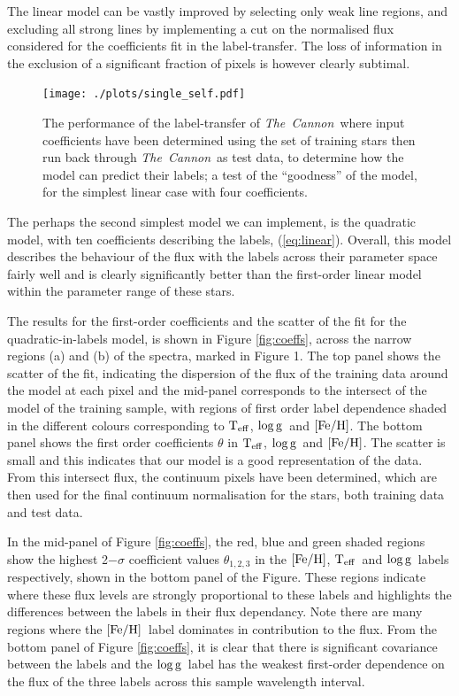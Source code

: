 \documentclass[12pt, preprint]{aastex}
\newcommand{\teff}{\mbox{$\rm T_{eff}$}}
\newcommand{\feh}{\mbox{$\rm [Fe/H]$}}
\newcommand{\logg}{\mbox{$\rm \log g$}}
\newcommand{\tc}{\textsl{The~Cannon}}
\begin{document}
The linear model can be vastly improved by selecting only weak line regions, and excluding all strong lines by implementing a cut on the normalised flux considered for the coefficients fit in the label-transfer. The loss of information in the exclusion of a significant fraction of pixels is however clearly subtimal. 

\begin{figure}[h!]
\centering
  \texttt{[image: ./plots/single\_self.pdf]}
\caption{The performance of the label-transfer of \tc\, where input coefficients have been determined using the set of training stars then run back through \tc\ as test data, to determine how the model can predict their labels; a test of the ``goodness'' of the model, for the simplest linear case with four coefficients. }
\label{fig:self1}
\end{figure}

The perhaps the second simplest model we can implement, is the quadratic model, with ten coefficients describing the labels, (\ref{eq:linear}).  Overall, this model describes the behaviour of the flux with the labels across their parameter space fairly well and is clearly significantly better than the first-order linear model within the parameter range of these stars. 

The results for the first-order coefficients and the scatter of the fit for the quadratic-in-labels model, is shown in Figure \ref{fig:coeffs}, across the narrow regions (a) and (b) of the spectra, marked in Figure 1. The top panel shows the scatter of the fit, indicating the dispersion of the flux of the training data around the model at each pixel and the mid-panel corresponds to the intersect of the model of the training sample, with regions of first order label dependence shaded in the different colours corresponding to \teff, \logg\ and \feh. The bottom panel shows the first order coefficients $\theta$ in \teff, \logg\ and \feh.  The scatter is small and this indicates that our model is a good representation of the data. From this intersect flux, the continuum pixels have been determined, which  are then used for the final continuum normalisation for the stars, both training data and test data. 

 In the mid-panel of Figure \ref{fig:coeffs}, the red, blue and green shaded regions show the highest 2$-\sigma$ coefficient values $\theta_{1,2,3}$ in the \feh, \teff\ and \logg\ labels respectively, shown in the bottom panel of the Figure. These regions indicate where these flux levels are strongly proportional to these labels and highlights the differences between the labels in their flux dependancy. Note there are many regions where the \feh\ label dominates in contribution to the flux. From the bottom panel of Figure \ref{fig:coeffs}, it is clear that there is significant covariance between the labels and the \logg\ label has the weakest first-order dependence on the flux of the three labels across this sample wavelength interval. 
\end{document}
